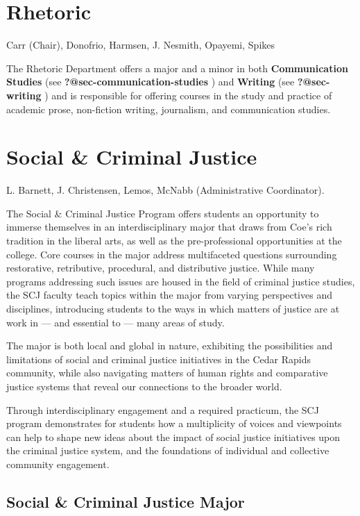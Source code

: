 \documentclass[
  letterpaper,
]{scrbook}
\begin{document}
\section{Rhetoric}\label{rhetoric}

Carr (Chair), Donofrio, Harmsen, J. Nesmith, Opayemi, Spikes

The Rhetoric Department offers a major and a minor in both
\textbf{Communication Studies} (see \textbf{?@sec-communication-studies}
) and \textbf{Writing} (see \textbf{?@sec-writing} ) and is responsible
for offering courses in the study and practice of academic prose,
non-fiction writing, journalism, and communication studies.

\section{Social \& Criminal Justice}\label{social-criminal-justice}

L. Barnett, J. Christensen, Lemos, McNabb (Administrative Coordinator).

The Social \& Criminal Justice Program offers students an opportunity to
immerse themselves in an interdisciplinary major that draws from Coe's
rich tradition in the liberal arts, as well as the pre-professional
opportunities at the college. Core courses in the major address
multifaceted questions surrounding restorative, retributive, procedural,
and distributive justice. While many programs addressing such issues are
housed in the field of criminal justice studies, the SCJ faculty teach
topics within the major from varying perspectives and disciplines,
introducing students to the ways in which matters of justice are at work
in --- and essential to --- many areas of study.

The major is both local and global in nature, exhibiting the
possibilities and limitations of social and criminal justice initiatives
in the Cedar Rapids community, while also navigating matters of human
rights and comparative justice systems that reveal our connections to
the broader world.

Through interdisciplinary engagement and a required practicum, the SCJ
program demonstrates for students how a multiplicity of voices and
viewpoints can help to shape new ideas about the impact of social
justice initiatives upon the criminal justice system, and the
foundations of individual and collective community engagement.

\subsection{Social \& Criminal Justice
Major}\label{social-criminal-justice-major}
\end{document}
